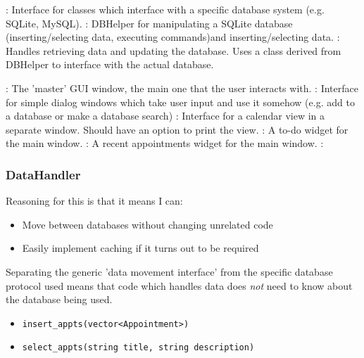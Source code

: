 \begin{itemize}
    : Interface for classes which interface with a specific
    database system (e.g. SQLite, MySQL).
    : DBHelper for manipulating a SQLite database
    (inserting/selecting data, executing commands)and inserting/selecting data.
    : Handles retrieving data and updating the database.
    Uses a class derived from DBHelper to interface with the actual database.
\end{itemize}

\begin{itemize}
    : The 'master' GUI window, the main one that the
        user interacts with.
    : Interface for simple dialog windows
        which take user input and use it somehow (e.g. add to a database or make
        a database search)
    : Interface for a calendar view in a separate
        window. Should have an option to print the view.
    : A to-do widget for the main window.
    : A recent appointments widget for the main
    window.
    :
\end{itemize}


\subsubsection{DataHandler}

Reasoning for this is that it means I can:

\begin{itemize}
    \item Move between databases without changing unrelated code
    \item Easily implement caching if it turns out to be required
\end{itemize}

Separating the generic 'data movement interface' from the specific database
protocol used means that code which handles data does \textit{not} need to know
about the database being used.

\begin{itemize}
    \item \verb+insert_appts(vector<Appointment>)+
    \item \verb+select_appts(string title, string description)+
\end{itemize}
